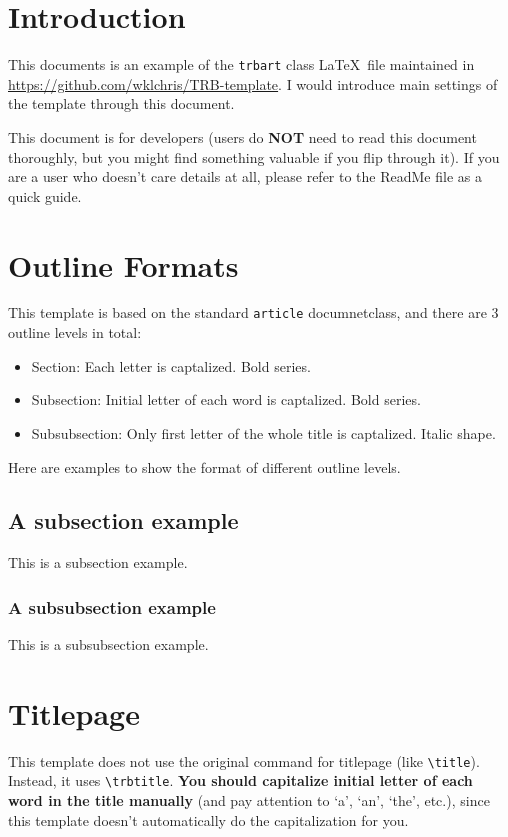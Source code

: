 \documentclass[12pt]{trbart}
\begin{document}
\linenumbers%
\maketitle


\section{Introduction}
This documents is an example of the \texttt{trbart} class \LaTeX\ file maintained in \url{https://github.com/wklchris/TRB-template}. I would introduce main settings of the template through this document.

This document is for developers (users do \textbf{NOT} need to read this document thoroughly, but you might find something valuable if you flip through it). If you are a user who doesn't care details at all, please refer to the ReadMe file as a quick guide.


\section{Outline Formats}
This template is based on the standard \texttt{article} documnetclass, and there are 3 outline levels in total:
\begin{itemize}
    \item Section: Each letter is captalized. Bold series.
    \item Subsection: Initial letter of each word is captalized. Bold series.
    \item Subsubsection: Only first letter of the whole title is captalized. Italic shape.
\end{itemize}

Here are examples to show the format of different outline levels.

\subsection{A subsection example}
This is a subsection example.

\subsubsection{A subsubsection example}
This is a subsubsection example.


\section{Titlepage}
This template does not use the original command for titlepage (like \verb+\title+). Instead, it uses \verb+\trbtitle+. \textbf{You should capitalize initial letter of each word in the title manually} (and pay attention to `a', `an', `the', etc.), since this template doesn't automatically do the capitalization for you.
\end{document}
